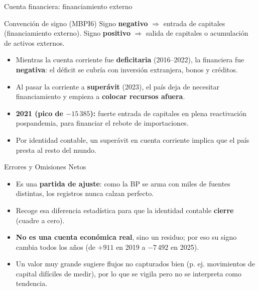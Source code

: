 \documentclass[10pt,aspectratio=169]{beamer}
\begin{document}
\begin{frame}{Cuenta financiera: financiamiento externo}
  \small
  \begin{block}{Convención de signo (MBPI6)}
    Signo \textbf{negativo} $\Rightarrow$ entrada de capitales (financiamiento externo). Signo \textbf{positivo} $\Rightarrow$ salida de capitales o acumulación de activos externos.
  \end{block}
  \begin{itemize}\footnotesize
    \item Mientras la cuenta corriente fue \textbf{deficitaria} (2016--2022), la financiera fue \textbf{negativa}: el déficit se cubría con inversión extranjera, bonos y créditos.
    \item Al pasar la corriente a \textbf{superávit} (2023), el país deja de necesitar financiamiento y empieza a \textbf{colocar recursos afuera}.
    \item \textbf{2021 (pico de $-15\,385$):} fuerte entrada de capitales en plena reactivación pospandemia, para financiar el rebote de importaciones.
    \item Por identidad contable, un superávit en cuenta corriente implica que el país presta al resto del mundo.
  \end{itemize}
\end{frame}

\begin{frame}{Errores y Omisiones Netos}
  \small
  \begin{itemize}
    \item Es una \textbf{partida de ajuste}: como la BP se arma con miles de fuentes distintas, los registros nunca calzan perfecto.
    \item Recoge esa diferencia estadística para que la identidad contable \textbf{cierre} (cuadre a cero).
    \item \textbf{No es una cuenta económica real}, sino un residuo; por eso su signo cambia todos los años (de $+911$ en 2019 a $-7\,492$ en 2025).
    \item Un valor muy grande sugiere flujos no capturados bien (p. ej. movimientos de capital difíciles de medir), por lo que se vigila pero no se interpreta como tendencia.
  \end{itemize}
\end{frame}
\end{document}
